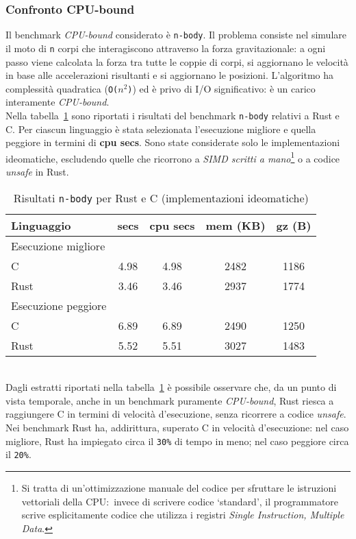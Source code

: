 \subsubsection{Confronto CPU-bound}\label{par:cpu-bound} Il benchmark \textit{CPU-bound} considerato è \texttt{n-body}. Il problema consiste
nel simulare il moto di \texttt{n} corpi che interagiscono attraverso la forza gravitazionale:
a ogni passo viene calcolata la forza tra tutte le coppie di corpi,
si aggiornano le velocità in base alle accelerazioni risultanti e si aggiornano le posizioni.
L'algoritmo ha complessità quadratica (\texttt{O($n^2$)}) ed è privo di I/O significativo: è un carico interamente \textit{CPU-bound}. \hfill
\vspace{10pt}\\
\noindent Nella tabella~\ref{tab:n-body} sono riportati i risultati del benchmark \texttt{n-body} relativi a Rust e C. 
Per ciascun linguaggio è stata selezionata l'esecuzione migliore e quella peggiore in termini di \textbf{cpu secs}. Sono state considerate solo 
le implementazioni ideomatiche, escludendo quelle che ricorrono a \textit{SIMD scritti a mano}\footnote{Si tratta di un'ottimizzazione manuale del codice per sfruttare le istruzioni vettoriali della CPU:\  invece di scrivere codice `standard', il programmatore scrive esplicitamente codice che utilizza i registri \textit{Single Instruction, Multiple Data}.} o a codice \textit{unsafe} in Rust. \hfill
\begin{table}[h]
    \centering
    \begin{tabular}{lcccc}
        \toprule
        \textbf{Linguaggio} & \textbf{secs} & \textbf{cpu secs} & \textbf{mem} (KB) & \textbf{gz} (B) \\
        \midrule
        Esecuzione migliore & & & & \\
        C  & 4.98 & 4.98 & 2482 & 1186 \\
        Rust & 3.46 & 3.46 & 2937 & 1774 \\
        \midrule
        Esecuzione peggiore & & & & \\
        C & 6.89 & 6.89 & 2490 & 1250 \\
        Rust & 5.52 & 5.51 & 3027 & 1483 \\
        \bottomrule
    \end{tabular}
    \caption{\small{Risultati \texttt{n-body} per Rust e C (implementazioni ideomatiche)}}\label{tab:n-body}
\end{table}
\vspace{1pt}\\
\noindent Dagli estratti riportati nella tabella~\ref{tab:n-body} è possibile osservare che, da un punto di vista temporale, anche in un benchmark puramente \textit{CPU-bound},
Rust riesca a raggiungere C in termini di velocità d'esecuzione, senza ricorrere a codice \textit{unsafe}. 
Nei benchmark Rust ha, addirittura, superato C in velocità d'esecuzione:
nel caso migliore, Rust ha impiegato
circa il \texttt{30\%} di tempo in meno; nel caso peggiore circa il \texttt{20\%}. 

